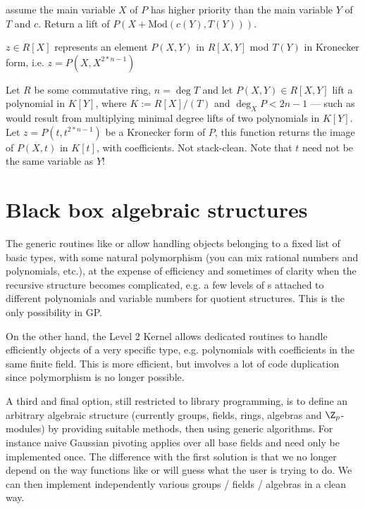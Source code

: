 


 assume the main variable
$X$ of $P$ has higher priority than the main variable $Y$ of $T$ and $c$.
Return a lift of $P(X+\text{Mod}(c(Y), T(Y)))$.

 $z\in R[X]$ represents an element
$P(X,Y)$ in $R[X,Y]$ mod $T(Y)$ in Kronecker form, i.e. $z = P(X,X^{2*n-1})$

Let $R$ be some commutative ring, $n = \deg T$ and let $P(X,Y)\in R[X,Y]$ lift
a polynomial in $K[Y]$, where $K := R[X]/(T)$ and $\deg_X P < 2n-1$ --- such as
would result from multiplying minimal degree lifts of two polynomials in
$K[Y]$. Let $z = P(t,t^{2*n-1})$ be a Kronecker form of $P$, this function
returns the image of $P(X,t)$ in $K[t]$, with  coefficients.
Not stack-clean. Note that $t$ need not be the same variable as $Y$!

\chapter{Black box algebraic structures}

The generic routines like  or  allow handling objects
belonging to a fixed list of basic types, with some natural polymorphism
(you can mix rational numbers and polynomials, etc.), at the expense of
efficiency and sometimes of clarity when the recursive structure becomes
complicated, e.g. a few levels of s attached to different
polynomials and variable numbers for quotient structures. This
is the only possibility in GP.

On the other hand, the Level 2 Kernel allows dedicated routines to handle
efficiently objects of a very specific type, e.g. polynomials with
coefficients in the same finite field. This is more efficient, but imvolves a
lot of code duplication since polymorphism is no longer possible.

A third and final option, still restricted to library programming, is to
define an arbitrary algebraic structure (currently groups, fields, rings,
algebras and $\Z_p$-modules) by providing suitable methods, then using generic
algorithms. For instance naive Gaussian pivoting applies over all base fields
and need only be implemented once. The difference with the first solution
is that we no longer depend on the way functions like  or
 will guess what the user is trying to do. We can then implement
independently various groups / fields / algebras in a clean way.

